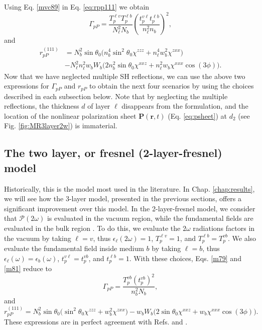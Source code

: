 Using Eq. \eqref{mvc89} in Eq. \eqref{eq:rpp111} we obtain
\begin{equation}\label{m79}
\Gamma_{pP}=
\frac{T_{p}^{\ell v}T^{\ell b}_{p}}{N^{2}_{\ell}N_{b}}
\left(\frac{t_{p}^{v\ell}t^{\ell b}_{p}}{n^{2}_{\ell}n_{b}}\right)^{2},  
\end{equation}
and
\begin{equation}\label{m81}
\begin{split}
r^{(111)}_{pP}& =
N^{2}_{b}\sin\theta_{0}
\Big(
  n^{4}_{b}\sin^{2}\theta_{0}\chi^{zzz} + n^{4}_{\ell}w^2_{b}\chi^{zxx}
\Big)\\
&- N^{2}_{\ell}n^{2}_{\ell}w_{b}W_{b}
\Big(
  2n^{2}_{b}\sin\theta_{0}\chi^{xxz} + n^{2}_{\ell}w_{b}\chi^{xxx}\cos(3\phi) 
\Big).
\end{split}
\end{equation}
Now that we have neglected multiple SH reflections, we can use the above two
expressions for $\Gamma_{pP}$ and $r_{pP}$ to obtain the next four scenarios by
using the choices described in each subsection below. Note that by neglecting
the multiple reflections, the thickness $d$ of layer $\ell$ disappears from the
formulation, and the location of the nonlinear polarization sheet
$\mathbf{P}(\mathbf{r},t)$ (Eq. \eqref{eq:psheet}) at $d_{2}$ (see Fig.
\ref{fig:MR3layer2w}) is immaterial.



\subsection{The two layer, or fresnel (2-layer-fresnel) model}
\label{sec:2-layer-fresnel}

Historically, this is the model most used in the literature. In Chap.
\ref{chap:results}, we will see how the 3-layer model, presented in the previous
sections, offers a significant improvement over this model. In the
2-layer-fresnel model, we consider that $\boldsymbol{\mathcal{P}}(2\omega)$ is
evaluated in the vacuum region, while the fundamental fields are evaluated in
the bulk region \cite{sipePRB87, mizrahiJOSA88}. To do this, we evaluate the
$2\omega$ radiations factors in the vacuum by taking $\ell = v$, thus
$\epsilon_{\ell}(2\omega) = 1$, $T^{\ell v}_{p} = 1$, and $T^{\ell b}_{p} =
T^{vb}_{p}$. We also evaluate the fundamental field inside medium $b$ by taking
$\ell = b$, thus $\epsilon_{\ell}(\omega) = \epsilon_{b}(\omega)$,
$t^{v\ell}_{p} = t^{vb}_{p}$, and $t^{\ell b}_{p} = 1$. With these choices, Eqs.
\eqref{m79} and \eqref{m81} reduce to
\begin{equation}\label{eq:m78}
\Gamma_{pP}
= \frac{T^{v b}_{p}(t^{vb}_{p})^2}{n^{2}_{b}N_{b}}, 
\end{equation}
and
\begin{equation}\label{eq:m82}
r^{(111)}_{pP} =
N^{2}_{b}\sin\theta_{0}
\Big(
\sin^{2}\theta_{0}\chi^{zzz} + w^{2}_{b}\chi^{zxx}
\Big)
- w_{b}W_{b}
\Big(
2\sin\theta_{0}\chi^{xxz} + w_{b}\chi^{xxx}\cos(3\phi)
\Big).
\end{equation}
These expressions are in perfect agreement with Refs. \cite{sipePRB87} and
\cite{mizrahiJOSA88}.


